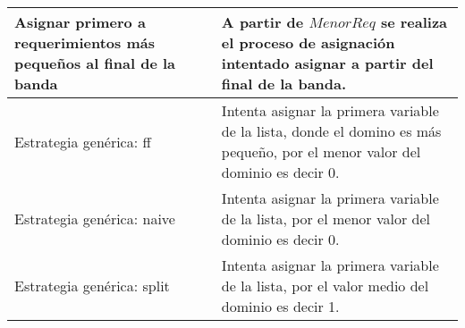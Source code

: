 \begin{center}
\begin{longtable}{|p{3cm}|p{13.5cm}|}
	\hline
	Asignar primero a requerimientos más pequeños al final de la banda & A partir de $MenorReq$ se realiza el proceso de asignación intentado asignar a partir del final de la banda.\\
	\hline
	Estrategia genérica: ff & Intenta asignar la primera variable de la lista, donde el domino es más pequeño, por el menor valor del dominio es decir 0.\\
	\hline
	Estrategia genérica: naive  & Intenta asignar la primera variable de la lista, por el menor valor del dominio es decir 0.\\
	\hline
	Estrategia genérica: split  & Intenta asignar la primera variable de la lista, por el valor medio del dominio es decir 1.\\
	\hline
\end{longtable}	
\end{center}
